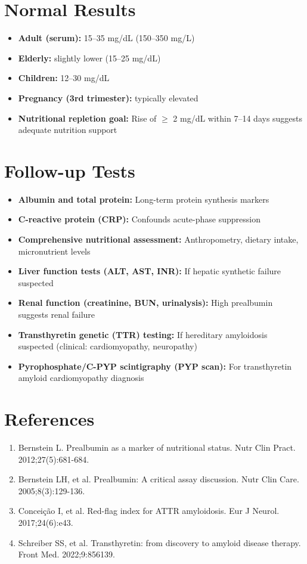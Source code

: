 \section*{Normal Results}
\begin{itemize}
  \item \textbf{Adult (serum):} 15--35 mg/dL (150--350 mg/L)
  \item \textbf{Elderly:} slightly lower (15--25 mg/dL)
  \item \textbf{Children:} 12--30 mg/dL
  \item \textbf{Pregnancy (3rd trimester):} typically elevated
  \item \textbf{Nutritional repletion goal:} Rise of $\geq$ 2 mg/dL within 7--14 days suggests adequate nutrition support
\end{itemize}

\section*{Follow-up Tests}
\begin{itemize}
  \item \textbf{Albumin and total protein:} Long-term protein synthesis markers
  \item \textbf{C-reactive protein (CRP):} Confounds acute-phase suppression
  \item \textbf{Comprehensive nutritional assessment:} Anthropometry, dietary intake, micronutrient levels
  \item \textbf{ Liver function tests (ALT, AST, INR):} If hepatic synthetic failure suspected
  \item \textbf{Renal function (creatinine, BUN, urinalysis):} High prealbumin suggests renal failure
  \item \textbf{Transthyretin genetic (TTR) testing:} If hereditary amyloidosis suspected (clinical: cardiomyopathy, neuropathy)
  \item \textbf{Pyrophosphate/C-PYP scintigraphy (PYP scan):} For transthyretin amyloid cardiomyopathy diagnosis
\end{itemize}

\section*{References}
\begin{enumerate}
  \item Bernstein L. Prealbumin as a marker of nutritional status. Nutr Clin Pract. 2012;27(5):681-684.
  \item Bernstein LH, et al. Prealbumin: A critical assay discussion. Nutr Clin Care. 2005;8(3):129-136.
  \item Conceição I, et al. Red-flag index for ATTR amyloidosis. Eur J Neurol. 2017;24(6):e43.
  \item Schreiber SS, et al. Transthyretin: from discovery to amyloid disease therapy. Front Med. 2022;9:856139.
\end{enumerate}

\clearpage